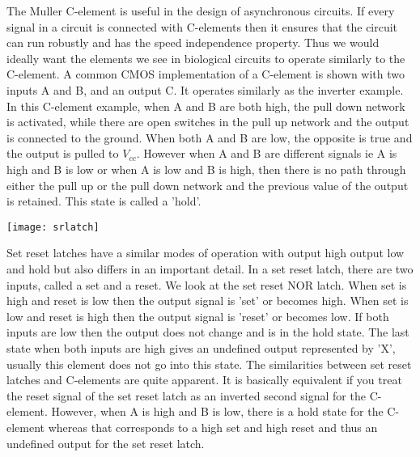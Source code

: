 \documentclass{article}
\begin{document}
The Muller C-element is useful in the design of asynchronous circuits.  If every signal in a circuit is connected with C-elements then it ensures that the circuit can run robustly and has the speed independence property.  Thus we would ideally want the elements we see in biological circuits to operate similarly to the C-element.  A common CMOS implementation of a C-element is shown with two inputs A and B, and an output C.  It operates similarly as the inverter example.  In this C-element example, when A and B are both high, the pull down network is activated, while there are open switches in the pull up network and the output is connected to the ground.  When both A and B are low, the opposite is true and the output is pulled to $V_{cc}$.  However when A and B are different signals ie A is high and B is low or when A is low and B is high, then there is no path through either the pull up or the pull down network and the previous value of the output is retained.  This state is called a 'hold'.
\newline 
\begin{center}
\texttt{[image: srlatch]}
\end{center}
Set reset latches have a similar modes of operation with output high output low and hold but also differs in an important detail.  In a set reset latch, there are two inputs, called a set and a reset.  We look at the set reset NOR latch.  When set is high and reset is low then the output signal is 'set' or becomes high.  When set is low and reset is high then the output signal is 'reset' or becomes low.  If both inputs are low then the output does not change and is in the hold state.  The last state when both inputs are high gives an undefined output represented by 'X', usually this element does not go into this state.  The similarities between set reset latches and C-elements are quite apparent.  It is basically equivalent if you treat the reset signal of the set reset latch as an inverted second signal for the C-element.  However, when A is high and B is low, there is a hold state for the C-element whereas that corresponds to a high set and high reset and thus an undefined output for the set reset latch.
\newline  \newline
\end{document}
